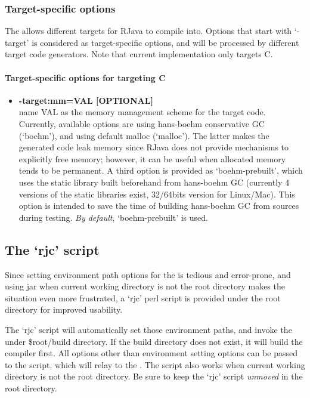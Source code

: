 \documentclass[12pt]{article}
\begin{document}
\subsubsection*{Target-specific options}
The \rjc allows different targets for RJava to compile into. 
Options that start with
`-target' is considered as target-specific options, and will be
processed by different target code generators. 
Note that current implementation only targets C. 

\paragraph*{Target-specific options for targeting C}

\begin{itemize}
\item
\textbf{-target:mm=VAL [OPTIONAL]\\}
name VAL as the memory management scheme for 
the target code. Currently, available options are 
using hans-boehm conservative GC (`boehm'),
and using default malloc (`malloc'). The latter makes
the generated code leak memory since RJava does 
not provide mechanisms to explicitly free memory;
however, it can be useful when allocated memory tends
to be permanent. A third option is provided as 
`boehm-prebuilt', which uses the static library built beforehand
from hans-boehm GC (currently 4 versions of the static libraries
exist, 32/64bits version for Linux/Mac). 
This option is intended to save
the time of building hans-boehm GC from sources during testing. 
\emph{By default}, `boehm-prebuilt' is used. 

\end{itemize}

\subsection{The `rjc' script}

Since setting environment path options for the \rjcfull is 
tedious and error-prone, and using \rjc jar when current
working directory is not the \rjc root directory makes the situation 
even more frustrated, 
a `rjc' perl script is provided under the root directory for
improved usability. 

The `rjc' script will automatically set
those environment paths, and invoke the \rjcfull under 
\$root/build directory. If the build directory does not exist, 
it will build the compiler first. 
All options other than environment setting options can be passed
to the script, which will relay to the \rjcfull. 
The script also works when current working directory is not the
\rjc root directory. 
Be sure to keep the `rjc' script \emph{unmoved} in the \rjc root
directory. 
\end{document}
